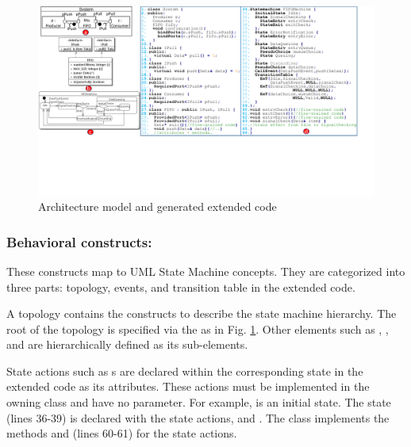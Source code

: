   

\begin{figure}
	\centering
	\includegraphics[clip, trim=0cm 5.9cm 1.6cm 0cm, width=\textwidth]{figures/approachexample.pdf}
	\caption{Architecture model and generated extended code} 
	\label{fig:approachexample}
\end{figure}


\subsubsection{Behavioral constructs:}
These constructs map to UML State Machine concepts. They are categorized into three parts: topology, events, and transition table in the extended code.


\noindent
{}
A topology contains the constructs to describe the state machine hierarchy.
The root of the topology is specified via the  as in Fig. \ref{fig:approachexample}.
Other elements such as , , and  are hierarchically defined as its sub-elements.

State actions such as s are declared within the corresponding state in the extended code as its attributes.
These actions must be implemented in the owning class and have no parameter.
For example,  is an initial state. 
The  state (lines 36-39) is declared with the state actions,  and . 
The  class implements the methods  and  (lines 60-61) for the state actions.


